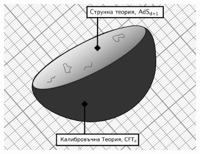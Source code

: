 \documentclass[bulg]{beamer}
\begin{document}
\begin{frame}
\begin{minipage}[t]{0.55\linewidth}
\begin{figure}
      \includegraphics[width=0.9\textwidth]{images/drawing.png}
    \end{figure}
    \end{minipage}%
  \end{frame}
\end{document}
